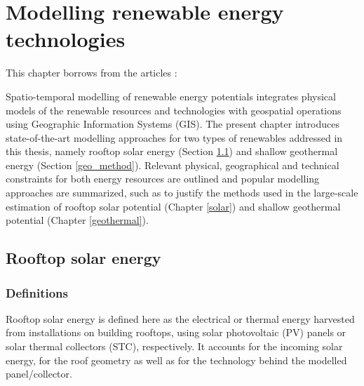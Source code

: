 
\chapter{Modelling renewable energy technologies}
\label{methods_physical}

\vspace{-15pt} %
\begin{tcolorbox}[enhanced,width=\textwidth,size=fbox,
        sharp corners,colframe=black!5!white,drop fuzzy shadow southeast,
        boxrule=3mm, parbox=false] 
        
This chapter borrows from the articles \citep{walch_big_2020,walch_quantifying_2021}:

\qquad {}

\qquad {}
\end{tcolorbox}

Spatio-temporal modelling of renewable energy potentials integrates physical models of the renewable resources and technologies with geospatial operations using Geographic Information Systems (GIS).
The present chapter introduces state-of-the-art modelling approaches for two types of renewables addressed in this thesis, namely rooftop solar energy (Section \ref{solar_method}) and shallow geothermal energy (Section \ref{geo_method}). 
Relevant physical, geographical and technical constraints for both energy resources are outlined and popular modelling approaches are summarized, such as to justify the methods used in the large-scale estimation of rooftop solar potential (Chapter \ref{solar}) and shallow geothermal potential (Chapter \ref{geothermal}).

\section{Rooftop solar energy}
\label{solar_method}

\subsection{Definitions}

Rooftop solar energy is defined here as the electrical or thermal energy harvested from installations on building rooftops, using solar photovoltaic (PV) panels or solar thermal collectors (STC), respectively. It accounts for the incoming solar energy, for the roof geometry as well as for the technology behind the modelled panel/collector. 



